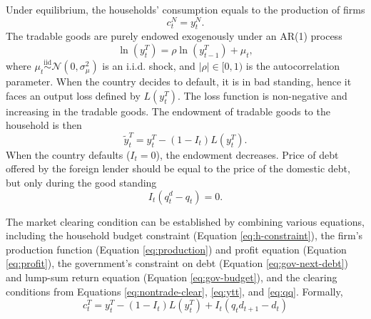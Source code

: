 Under equilibrium, the households' consumption equals to the production of firms
\begin{equation}
    \label{eq:nontrade-clear}
    c^N_{t} = y^N_t.
\end{equation}
The tradable goods are purely endowed exogenously under an AR(1) process
\begin{equation}
    \ln(y_t^T) = \rho \ln(y^T_{t-1}) + \mu_t,
\end{equation}
where $\mu_t \overset{\mathrm{iid}}{\sim} \mathcal{N}(0,\sigma_\mu^2)$ is an i.i.d. shock, and $ |\rho| \in [0,1)$ is the autocorrelation parameter.
When the country decides to default, it is in bad standing, hence it faces an output loss defined by $L(y^T_t)$. The loss function is non-negative and increasing in the tradable goods. The endowment of tradable goods to the household is then
\begin{equation}
    \label{eq:ytt}
    \tilde{y}^T_t =
        y^T_t  - (1 - I_t) L(y^T_t).
\end{equation}
When the country defaults ($I_t = 0$), the endowment decreases.
Price of debt offered by the foreign lender should be equal to the price of the domestic debt, but only during the good standing
\begin{equation}
    \label{eq:qq}
    I_t(q^d_t - q_t) = 0.
\end{equation}

The market clearing condition can be established by combining various equations, including the household budget constraint (Equation \eqref{eq:h-constraint}), the firm's production function (Equation \eqref{eq:production}) and profit equation (Equation \eqref{eq:profit}), the government's constraint on debt (Equation \eqref{eq:gov-next-debt}) and lump-sum return equation (Equation \eqref{eq:gov-budget}), and the clearing conditions from Equations \eqref{eq:nontrade-clear}, \eqref{eq:ytt}, and \eqref{eq:qq}.
Formally,
\begin{equation}
    \label{eq:market-clearing}
    c^T_t = y^T_t - (1 - I_t)L(y^T_t) + I_t(q_t d_{t+1} - d_t)
\end{equation}

